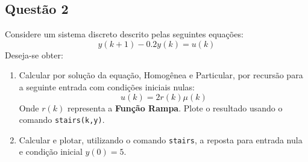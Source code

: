 \documentclass{article}
\begin{document}
        \subsection{Questão 2}
            \begin{exercise}
                Considere um sistema discreto descrito pelas seguintes equações:
                    \begin{equation*}
                        y(k+1) - 0.2y(k) = u(k)
                    \end{equation*}
                Deseja-se obter:
                    \begin{enumerate}[label=(\alph*), rightmargin = \leftmargin]
                        \item \label{ex:2A}Calcular por solução da equação, Homogênea e Particular, por recursão para a seguinte entrada com condições iniciais nulas:
                            \begin{equation*}
                                u(k) = 2r(k)\mu(k)
                            \end{equation*}
                        Onde $r(k)$ representa a \textbf{Função Rampa}. Plote o resultado usando o comando \texttt{stairs(k,y)}.

                        \item \label{ex:2B}Calcular e plotar, utilizando o comando \texttt{stairs}, a reposta para entrada nula e condição inicial $y(0) = 5$.
                    \end{enumerate}
            \end{exercise}
\newpage
\end{document}
